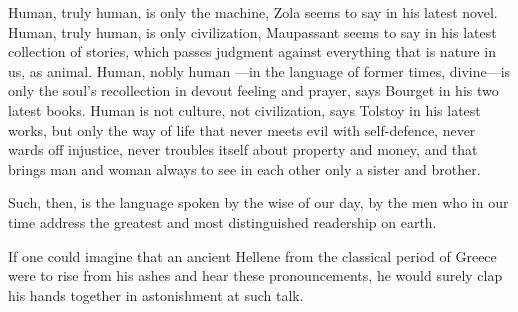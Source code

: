 \documentclass[12pt,a4paper]{article}
\begin{document}
Human, truly human, is only the machine, Zola seems to say in his
latest novel. Human, truly human, is only civilization, Maupassant
seems to say in his latest collection of stories, which passes judgment
against everything that is nature in us, as animal. Human, nobly human
---in the language of former times, divine---is only the soul's
recollection in devout feeling and prayer, says Bourget in his two
latest books. Human is not culture, not civilization, says Tolstoy in
his latest works, but only the way of life that never meets evil with
self-defence, never wards off injustice, never troubles itself about
property and money, and that brings man and woman always to see in
each other only a sister and brother.

Such, then, is the language spoken by the wise of our day, by the men
who in our time address the greatest and most distinguished readership
on earth.

If one could imagine that an ancient Hellene from the classical period
of Greece were to rise from his ashes and hear these pronouncements,
he would surely clap his hands together in astonishment at such talk.
\end{document}
